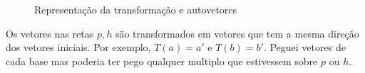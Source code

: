 \documentclass[english,ngerman,parskip=half]{scrartcl}
\begin{document}
\begin{enumerate}
\begin{enumerate}
\begin{figure}[ht!]
                \caption{Representação da transformação e autovetores}
            \end{figure}
            Os vetores nas retas $p, h$ são transformados em vetores que tem a mesma direção dos vetores iniciais. Por exemplo,
            $T(a) = a'$ e $T(b) = b'$. Peguei vetores de cada base mas poderia ter pego qualquer multiplo que estivessem sobre $p$ ou $h$.

        \end{enumerate}
\end{enumerate}
\end{document}
